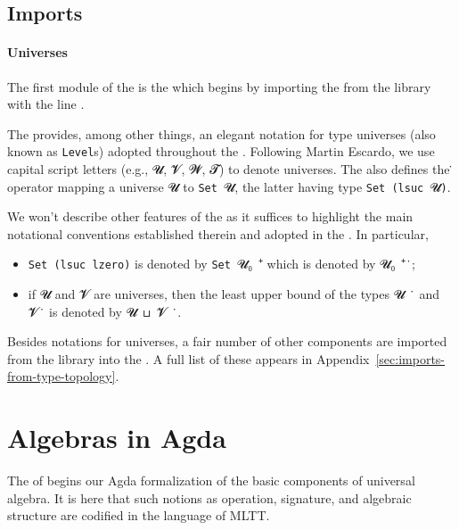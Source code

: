 \documentclass[a4paper,USenglish,cleveref,autoref,thm-restate]{lipics-v2019}
\begin{document}
\subsection{Imports}\label{sec:imports}
\paragraph*{Universes}
The first module of the \agdaualib is the \preludemodule which begins by importing the \universesmodule from the \typetopology library with the line \AgdaSpace{}\AgdaSpace{}\AgdaSpace{}.

The \universesmodule provides, among other things, an elegant notation for type universes (also known as \texttt{Level}s) adopted throughout the \agdaualib.
Following Martin Escardo, we use capital script letters (e.g., \ab 𝓤, \ab 𝓥, \ab 𝓦, \ab 𝓣) to denote universes. The \universesmodule also defines the ̇ operator mapping a universe \ab 𝓤 to \texttt{Set}\ \ab 𝓤, the latter having type \texttt{Set (lsuc}\ \ab 𝓤\texttt{)}.

We won't describe other features of the \universesmodule as it suffices to highlight the main notational conventions established therein and adopted in the \agdaualib. In particular,
\begin{itemize}
  \item \texttt{Set\ (lsuc\ lzero)} is denoted by \texttt{Set}\ \ab 𝓤₀\ ⁺ which is denoted by \ab 𝓤₀\ ⁺\ ̇;
  \item if \ab 𝓤 and \ab 𝓥 are universes, then the least upper bound of the types \ab 𝓤~ ̇ and \ab 𝓥\ ̇ is denoted by \ab 𝓤~⊔~\ab 𝓥~ ̇.
\end{itemize}

Besides notations for universes, a fair number of other components are imported from the \typetopology library into the \agdaualib. A full list of these appears in Appendix~\ref{sec:imports-from-type-topology}.

\section{Algebras in Agda}\label{sec:algebras-in-agda}
The \basicmodule of \agdaualib begins our Agda formalization of the basic components of universal algebra. It is here that such notions as operation, signature, and algebraic structure are codified in the language of MLTT.
\end{document}
